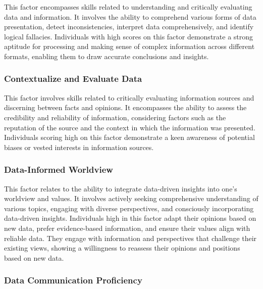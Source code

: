 \documentclass[
  12pt,
  a4paper,
  twoside]{article}
\begin{document}
This factor encompasses skills related to understanding and critically evaluating data and information. It involves the ability to comprehend various forms of data presentation, detect inconsistencies, interpret data comprehensively, and identify logical fallacies. Individuals with high scores on this factor demonstrate a strong aptitude for processing and making sense of complex information across different formats, enabling them to draw accurate conclusions and insights.

\hypertarget{contextualize-and-evaluate-data}{%
\subsubsection{Contextualize and Evaluate Data}\label{contextualize-and-evaluate-data}}

This factor involves skills related to critically evaluating information sources and discerning between facts and opinions. It encompasses the ability to assess the credibility and reliability of information, considering factors such as the reputation of the source and the context in which the information was presented. Individuals scoring high on this factor demonstrate a keen awareness of potential biases or vested interests in information sources.

\hypertarget{data-informed-worldview}{%
\subsubsection{Data-Informed Worldview}\label{data-informed-worldview}}

This factor relates to the ability to integrate data-driven insights into one's worldview and values. It involves actively seeking comprehensive understanding of various topics, engaging with diverse perspectives, and consciously incorporating data-driven insights. Individuals high in this factor adapt their opinions based on new data, prefer evidence-based information, and ensure their values align with reliable data. They engage with information and perspectives that challenge their existing views, showing a willingness to reassess their opinions and positions based on new data.

\hypertarget{data-communication-proficiency}{%
\subsubsection{Data Communication Proficiency}\label{data-communication-proficiency}}
\end{document}
